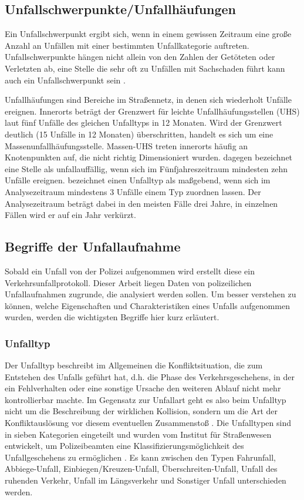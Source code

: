\subsection{Unfallschwerpunkte/Unfallhäufungen}
Ein Unfallschwerpunkt ergibt sich, wenn in einem gewissen Zeitraum eine große Anzahl an Unfällen mit einer bestimmten Unfallkategorie auftreten. Unfallschwerpunkte hängen nicht allein von den Zahlen der Getöteten oder Verletzten ab, eine Stelle die sehr oft zu Unfällen mit Sachschaden führt kann auch ein Unfallschwerpunkt sein \parencite[S. 145-151]{Huguenin.2017}.

Unfallhäufungen sind Bereiche im Straßennetz, in denen sich wiederholt Unfälle ereignen. Innerorts beträgt der Grenzwert für leichte Unfallhäufungsstellen (UHS) laut \Textcite[S. 13-16]{ForschungsgesellschaftfurStraenundVerkehrswesen.2012} fünf Unfälle des gleichen Unfalltyps in 12 Monaten. Wird der Grenzwert deutlich (15 Unfälle in 12 Monaten) überschritten, handelt es sich um eine Massenunfallhäufungsstelle. Massen-UHS treten innerorts häufig an Knotenpunkten auf, die nicht richtig Dimensioniert wurden. \Textcite[S. 221]{Schreiber.2014} dagegen bezeichnet eine Stelle als unfallauffällig, wenn sich im Fünfjahreszeitraum mindesten zehn Unfälle ereignen. \Textcite[S. 325]{Berger.2017} bezeichnet einen Unfalltyp als maßgebend, wenn sich im Analysezeitraum mindestens 3 Unfälle einem Typ zuordnen lassen. Der Analysezeitraum beträgt dabei in den meisten Fälle drei Jahre, in einzelnen Fällen wird er auf ein Jahr verkürzt.

\subsection{Begriffe der Unfallaufnahme}\label{subsection:Begriffe der Unfallaufnahme}
Sobald ein Unfall von der Polizei aufgenommen wird erstellt diese ein Verkehrsunfallprotokoll. Dieser Arbeit liegen Daten von polizeilichen Unfallaufnahmen zugrunde, die analysiert werden sollen. Um besser verstehen zu können, welche Eigenschaften und Charakteristiken eines Unfalls aufgenommen wurden, werden die wichtigsten Begriffe hier kurz erläutert.

\subsubsection{Unfalltyp}
Der Unfalltyp beschreibt im Allgemeinen die Konfliktsituation, die zum Entstehen des Unfalls geführt hat, d.h. die Phase des Verkehrsgeschehens, in der ein Fehlverhalten oder eine sonstige Ursache den weiteren Ablauf nicht mehr kontrollierbar machte. Im Gegensatz zur Unfallart geht es also beim Unfalltyp nicht um die Beschreibung der wirklichen Kollision, sondern um die Art der Konfliktauslösung vor diesem eventuellen Zusammenstoß \parencite[S. 16]{StatistischesBundesamt.2018b}. Die Unfalltypen sind in sieben Kategorien eingeteilt und wurden vom Institut für Straßenwesen entwickelt, um Polizeibeamten eine Klassifizierungsmöglichkeit des Unfallgeschehens zu ermöglichen \parencite[S. 16]{Gschwendtner.2015}. Es kann zwischen den Typen Fahrunfall, Abbiege-Unfall, Einbiegen/Kreuzen-Unfall, Überschreiten-Unfall, Unfall des ruhenden Verkehr, Unfall im Längsverkehr und Sonstiger Unfall unterschieden werden.

